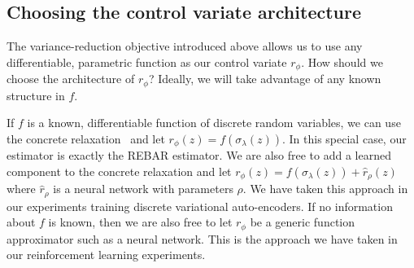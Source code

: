 \documentclass{article}
\newcommand{\E}{\mathbb{E}}
\newcommand{\PT}{\frac{\partial}{\partial \theta}}
\begin{document}
\subsection{Choosing the control variate architecture}
The variance-reduction objective introduced above allows us to use any differentiable, parametric function as our control variate $r_\phi$. 
How should we choose the architecture of $r_\phi$?
Ideally, we will take advantage of any known structure in $f$.

If $f$ is a known, differentiable function of discrete random variables, we can use the concrete relaxation~\cite{maddison2016concrete} and let $r_\phi(z) = f(\sigma_\lambda(z))$.
In this special case, our estimator is exactly the REBAR estimator.
We are also free to add a learned component to the concrete relaxation and let $r_\phi(z) = f(\sigma_\lambda(z)) + \hat{r}_\rho(z)$ where $\hat{r}_\rho$ is a neural network with parameters $\rho$.
We have taken this approach in our experiments training discrete variational auto-encoders.
If no information about $f$ is known, then we are also free to let $r_\phi$ be a generic function approximator such as a neural network.
This is the approach we have taken in our reinforcement learning experiments.
\end{document}
